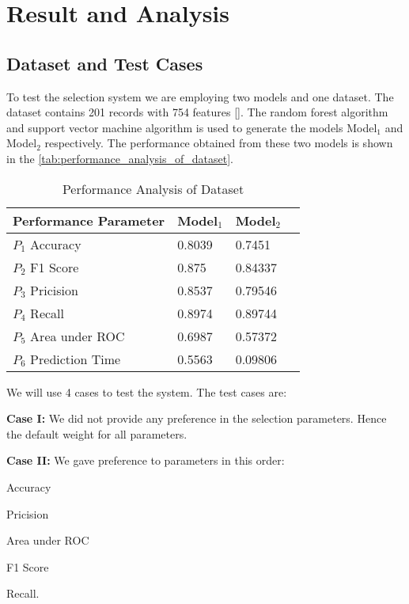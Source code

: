 \section{Result and Analysis}\label{sec:result_and_analysis}


\subsection{Dataset and Test Cases}\label{subsec:dataset_and_test_cases}

To test the selection system we are employing two models and one dataset. The dataset contains 201 records with 754 features []. The random forest algorithm and support vector machine algorithm is used to generate the models Model$_1$ and Model$_2$ respectively. The performance obtained from these two models is shown in the \autoref{tab:performance_analysis_of_dataset}.

\begin{table}[ht]
    \caption{Performance Analysis of Dataset}\label{tab:performance_analysis_of_dataset}
    \begin{tabular*}{\tblwidth}{@{}LLLL@{}}
        \toprule
        Performance Parameter & Model$_1$ & Model$_2$ \\
        \midrule
        $P_1$ \quad Accuracy & 0.8039 & 0.7451 \\
        $P_2$ \quad F1 Score & 0.875 & 0.84337 \\
        $P_3$ \quad Pricision & 0.8537 & 0.79546 \\
        $P_4$ \quad Recall & 0.8974 & 0.89744 \\
        $P_5$ \quad Area under ROC & 0.6987 & 0.57372 \\
        $P_6$ \quad Prediction Time & 0.5563 & 0.09806 \\
        \bottomrule
    \end{tabular*}
\end{table}

We will use 4 cases to test the system. The test cases are:

\noindent
{\bfseries Case I:} We did not provide any preference in the selection parameters. Hence the default weight for all parameters.

\vspace*{0.5em}
\noindent
{\bfseries Case II:} We gave preference to parameters in this order:
        \begin{enumerate*}[label=\arabic{*}.]
            \item Accuracy
            \item Pricision
            \item Area under ROC
            \item F1 Score
            \item Recall.
        \end{enumerate*}

